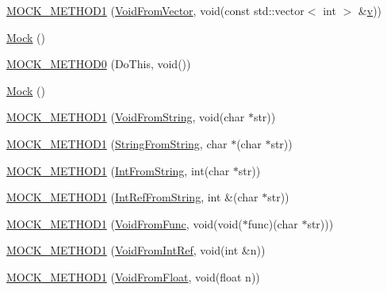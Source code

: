 \begin{DoxyCompactItemize}
\item 
\mbox{\hyperlink{class_mock_a50e2bda4375a59bb89fd5652bd33eb0f}{M\+O\+C\+K\+\_\+\+M\+E\+T\+H\+O\+D1}} (\mbox{\hyperlink{class_interface_ae84fe7e53f881db2f823ad35d004927a}{Void\+From\+Vector}}, void(const std\+::vector$<$ int $>$ \&\mbox{\hyperlink{_important_values_8h_aaad811047eb9ea3edb6ec2bbeddb2b2b}{v}}))
\item 
\mbox{\hyperlink{class_mock_a2b9528f2e7fcf9738201a5ea667c1998}{Mock}} ()
\item 
\mbox{\hyperlink{class_mock_ae710f23cafb1a2f17772e8805d6312d2}{M\+O\+C\+K\+\_\+\+M\+E\+T\+H\+O\+D0}} (Do\+This, void())
\item 
\mbox{\hyperlink{class_mock_a2b9528f2e7fcf9738201a5ea667c1998}{Mock}} ()
\item 
\mbox{\hyperlink{class_mock_ada59eea6991953353f332e3ea1e74444}{M\+O\+C\+K\+\_\+\+M\+E\+T\+H\+O\+D1}} (\mbox{\hyperlink{class_interface_a65d6ae604e7e9a513aec72c9c94e0b97}{Void\+From\+String}}, void(char $\ast$str))
\item 
\mbox{\hyperlink{class_mock_a2db4d82b6f92b4e462929f651ac4c3b1}{M\+O\+C\+K\+\_\+\+M\+E\+T\+H\+O\+D1}} (\mbox{\hyperlink{class_interface_a756b1d22c12aa3f14a5083f90043fbf0}{String\+From\+String}}, char $\ast$(char $\ast$str))
\item 
\mbox{\hyperlink{class_mock_ae73b4ee90bf6d84205d2b1c17f0b8433}{M\+O\+C\+K\+\_\+\+M\+E\+T\+H\+O\+D1}} (\mbox{\hyperlink{class_interface_ab34c8a5fd2236a6b009f86a4e5851b61}{Int\+From\+String}}, int(char $\ast$str))
\item 
\mbox{\hyperlink{class_mock_a2cece30a3ea92b34f612f8032fe3a0f9}{M\+O\+C\+K\+\_\+\+M\+E\+T\+H\+O\+D1}} (\mbox{\hyperlink{class_interface_ab93276de67e60c44fd775d4c139aa8e1}{Int\+Ref\+From\+String}}, int \&(char $\ast$str))
\item 
\mbox{\hyperlink{class_mock_ac70c052254fa9816bd759c006062dc47}{M\+O\+C\+K\+\_\+\+M\+E\+T\+H\+O\+D1}} (\mbox{\hyperlink{class_interface_a7dab3c82b857a9a5f52b3ce6f7df547f}{Void\+From\+Func}}, void(void($\ast$func)(char $\ast$str)))
\item 
\mbox{\hyperlink{class_mock_ae2379efbc030f1adf8b032be3bdf081d}{M\+O\+C\+K\+\_\+\+M\+E\+T\+H\+O\+D1}} (\mbox{\hyperlink{class_interface_aa43fb56650a57b6b3e7743e54e50cb86}{Void\+From\+Int\+Ref}}, void(int \&n))
\item 
\mbox{\hyperlink{class_mock_a3fd62026610c5d3d3aeaaf2ade3e18aa}{M\+O\+C\+K\+\_\+\+M\+E\+T\+H\+O\+D1}} (\mbox{\hyperlink{class_interface_ae2b3e9411c893a45642d3af632752c66}{Void\+From\+Float}}, void(float n))

\end{DoxyCompactItemize}
